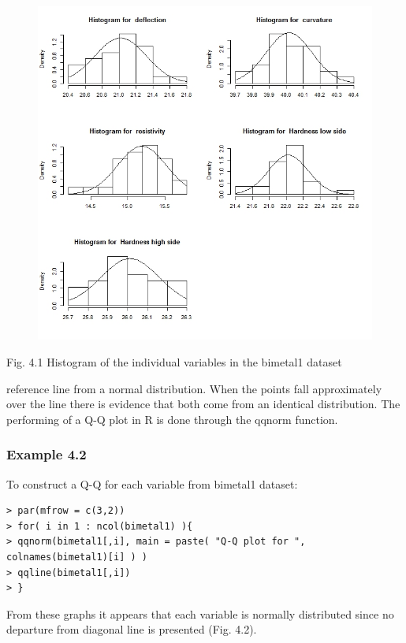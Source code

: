 \documentclass[]{beamer}
\begin{document}
\begin{frame}[fragile]
\begin{figure}
\centering
\includegraphics[width=0.7\linewidth]{MSQC-bimetal1hist}
\caption{}
\label{fig:MSQC-bimetal1hist}
\end{figure}
\end{frame}
\begin{frame}[fragile]

Fig. 4.1 Histogram of the individual variables in the bimetal1 dataset


reference line from a normal distribution. When the points fall approximately over
the line there is evidence that both come from an identical distribution.
The performing of a Q-Q plot in R is done through the qqnorm function.
\end{frame}
\begin{frame}[fragile]
\frametitle{Example 4.2}

To construct a Q-Q for each variable from bimetal1 dataset:
\begin{verbatim}
> par(mfrow = c(3,2))
> for( i in 1 : ncol(bimetal1) ){
> qqnorm(bimetal1[,i], main = paste( "Q-Q plot for ", colnames(bimetal1)[i] ) )
> qqline(bimetal1[,i])
> }
\end{verbatim}
\end{frame}
\begin{frame}[fragile]
From these graphs it appears that each variable is normally distributed since no
departure from diagonal line is presented (Fig. 4.2).

\end{frame}
\end{document}
